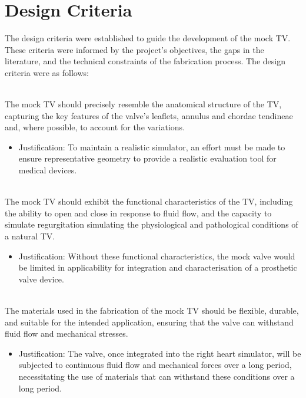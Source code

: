 \section{Design Criteria}\label{sec:Design Criteria}
The design criteria were established to guide the development of the mock \gls{TV}. These criteria were informed by the project's objectives, the gaps in the literature, and the technical constraints of the fabrication process.
The design criteria were as follows:
\begin{fullwidth}
    \\ The mock \gls{TV} should precisely resemble the anatomical structure of the \gls{TV}, capturing the key features of the valve's leaflets, annulus and chordae tendineae and, where possible, to account for the variations.
    \begin{itemize}
        \item Justification: To maintain a realistic simulator, an effort must be made to ensure representative geometry to provide a realistic evaluation tool for medical devices.
    \end{itemize}

    \label{sec:Functional Performance}\\ The mock \gls{TV} should exhibit the functional characteristics of the \gls{TV}, including the ability to open and close in response to fluid flow, and the capacity to simulate regurgitation simulating the physiological and pathological conditions of a natural \gls{TV}.
    \begin{itemize}
        \item Justification: Without these functional characteristics, the mock valve would be limited in applicability for integration and characterisation of a prosthetic valve device.
    \end{itemize}

    \\ The materials used in the fabrication of the mock \gls{TV} should be flexible, durable, and suitable for the intended application, ensuring that the valve can withstand fluid flow and mechanical stresses.
    \begin{itemize}
        \item Justification: The valve, once integrated into the right heart simulator, will be subjected to continuous fluid flow and mechanical forces over a long period, necessitating the use of materials that can withstand these conditions over a long period.
    \end{itemize}


\end{fullwidth}
